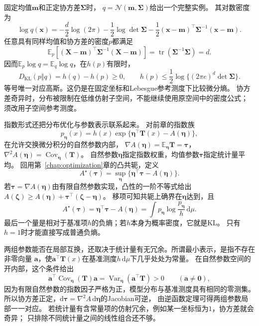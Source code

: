 固定均值\(\bm m\)和正定协方差\(\bm\Sigma\)时，
\(q=\mathcal N(\bm m,\bm\Sigma)\)给出一个完整实例。
其对数密度为
\[
  \log q(\bm x)
  =-\frac d2\log(2\pi)-\frac12\log\det\bm\Sigma
   -\frac12(\bm x-\bm m)^\top\bm\Sigma^{-1}(\bm x-\bm m).
\]
任意具有同样均值和协方差的密度\(p\)都满足
\[
  \mathbb E_p[(\bm X-\bm m)^\top\bm\Sigma^{-1}(\bm X-\bm m)]
  =\operatorname{tr}(\bm\Sigma^{-1}\bm\Sigma)=d.
\]
因而\(\mathbb E_p\log q=\mathbb E_q\log q\)，在\(h(p)\)有限时，
\[
  D_{\mathrm{KL}}(p\Vert q)=h(q)-h(p)\geq0,\qquad
  h(p)\leq\frac12\log\{(2\pi e)^d\det\bm\Sigma\}.
\]
等号唯一对应高斯。这仍是在固定坐标和Lebesgue参考测度下比较微分熵。
协方差奇异时，分布被限制在低维仿射子空间，不能继续使用原空间中的密度公式；
须改用子空间参考测度。

指数形式还把分布优化与参数表示联系起来。
对前章的指数族
\[
  p_{\bm\eta}(x)
  =h(x)\exp\{\bm\eta^\top\bm T(x)-A(\bm\eta)\},
\]
在允许交换微分积分的自然参数内部，
\(\nabla A(\bm\eta)=\mathbb E_{\bm\eta}\bm T=\bm\tau\)，
\(\nabla^2A(\bm\eta)=\operatorname{Cov}_{\bm\eta}(\bm T)\)。
自然参数\(\bm\eta\)指定指数权重，均值参数\(\bm\tau\)指定统计量平均。
回用第~\ref{chap:optimization}章的凸共轭，定义
\begin{equation}
  A^\star(\bm\tau)
  =\sup_{\bm\eta}\{\bm\eta^\top\bm\tau-A(\bm\eta)\}.
  \label{eq:information-log-partition-conjugate}
\end{equation}
若\(\bm\tau=\nabla A(\bm\eta)\)由有限自然参数实现，凸性的一阶不等式给出
\(A(\bm\zeta)\geq A(\bm\eta)+\bm\tau^\top(\bm\zeta-\bm\eta)\)。
移项可知共轭上确界在\(\bm\eta\)达到，且
\[
  A^\star(\bm\tau)=\bm\eta^\top\bm\tau-A(\bm\eta)
  =\int p_{\bm\eta}\log\frac{p_{\bm\eta}}h\,\mathrm d\mu.
\]
最后一个量是相对于基准项\(h\)的负熵；若\(h\)本身为概率密度，它就是KL。
只有\(h=1\)时才能直接写成普通负熵。

两组参数能否在局部互换，还取决于统计量有无冗余。所谓最小表示，是指不存在非零向量
\(\bm a\)，使\(\bm a^\top\bm T(x)\)在基准测度\(h\,\mathrm d\mu\)下几乎处处为常量。
在自然参数空间的开内部，这个条件给出
\[
 \bm a^\top\operatorname{Cov}_{\bm\eta}(\bm T)\bm a
 =\operatorname{Var}_{\bm\eta}(\bm a^\top\bm T)>0
 \qquad(\bm a\neq\bm0),
\]
因为有限自然参数的指数因子严格为正，模型分布与基准测度具有相同的零测集。
所以协方差正定，\(\mathrm d\bm\tau=\nabla^2A\,\mathrm d\bm\eta\)的Jacobian可逆，
由逆函数定理可得两组参数局部一一对应。
若统计量有含常量项的仿射冗余，例如某一坐标恒为\(1\)，协方差就会奇异；
只排除不同统计量之间的线性组合还不够。

